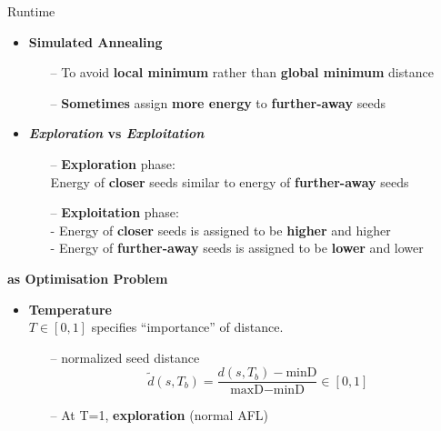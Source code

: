 \documentclass[10pt,aspectratio=43]{beamer}
\begin{document}
\begin{frame}{Runtime}
{\begin{itemize}
\begin{itemize}
                \item [--] energy:The number of fuzz generated for a seed s is also called the energy of s.
              \end{itemize}
            \item \textbf{Simulated Annealing}
            \begin{itemize}
                \item [--]To avoid \textbf{\textcolor{deepred}{local minimum}} rather than \textbf{\textcolor{deepgreen}{global minimum}} distance
                \item [--]\textbf{Sometimes} assign \textbf{\textcolor{deepred}{more energy}} to \textbf{\textcolor{deepblue}{further-away}} seeds
            \end{itemize}  
            \item \textbf{\textit{Exploration} vs \textit{Exploitation}} 
            \begin{itemize}
                \item [--]\textbf{Exploration} phase:\\
                    Energy of \textbf{\textcolor{deepred}{closer}} seeds similar to energy of \textbf{\textcolor{deepblue}{further-away}} seeds
                \item [--]\textbf{Exploitation} phase:\\
                    - Energy of \textbf{\textcolor{deepred}{closer}} seeds is assigned  to be \textbf{\textcolor{deepred}{higher}} and higher\\
                    - Energy of \textbf{\textcolor{deepblue}{further-away}} seeds is assigned to be \textbf{\textcolor{deepblue}{lower}} and lower
            \end{itemize}  
         \end{itemize}
    }
    {
        \textbf{ as \textcolor{deepgreen}{Optimisation Problem}}
        \begin{itemize}
            \item \textbf{Temperature} 
            \\ $T \in [0,1]$ specifies “importance” of distance.
            \begin{itemize}
                \item [--]normalized seed distance
                \\$$\widetilde{d}(s,T_b)=\frac{d(s,T_b)-\text{minD}}{\text{maxD}-\text{minD}} \in [0,1]$$
                \item [--]At T=1, \textbf{exploration} (normal AFL)

\end{itemize}
\end{itemize}}
\end{frame}
\end{document}
